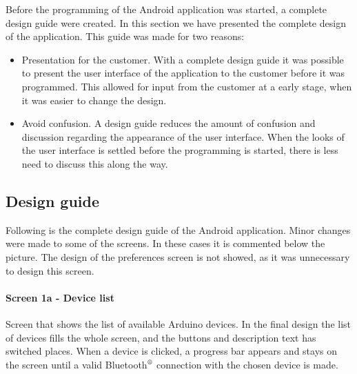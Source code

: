 Before the programming of the Android application was started, a complete design guide were created. In this section we have presented the complete design of the application. This guide was made for two reasons:
\begin{itemize}
	\item{Presentation for the customer.} With a complete design guide it was possible to present the user interface of the application to the customer before it was programmed. This allowed for input from the customer at a early stage, when it was easier to change the design.
	\item{Avoid confusion.} A design guide reduces the amount of confusion and discussion regarding the appearance of the user interface. When the looks of the user interface is settled before the programming is started, there is less need to discuss this along the way.
\end{itemize}

\subsection{Design guide}
Following is the complete design guide of the Android application. Minor changes were made to some of the screens. In these cases it is commented below the picture. The design of the preferences screen is not showed, as it was unnecessary to design this screen.

\paragraph{Screen 1a - Device list}
Screen that shows the list of available Arduino devices. In the final design the list of devices fills the whole screen, and the buttons and description text has switched places. When a device is clicked, a progress bar appears and stays on the screen until a valid Bluetooth$\textsuperscript{\textregistered}$ connection with the chosen device is made.

